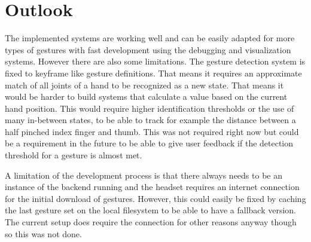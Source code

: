 \chapter{Outlook}

The implemented systems are working well and can be easily adapted for more types of gestures with fast development using the debugging and visualization systems. However there are also some limitations. The gesture detection system is fixed to keyframe like gesture definitions. That means it requires an approximate match of all joints of a hand to be recognized as a new state. That means it would be harder to build systems that calculate a value based on the current hand position. This would require higher identification thresholds or the use of many in-between states, to be able to track for example the distance between a half pinched index finger and thumb. This was not required right now but could be a requirement in the future to be able to give user feedback if the detection threshold for a gesture is almost met. 

A limitation of the development process is that there always needs to be an instance of the backend running and the headset requires an internet connection for the initial download of gestures. However, this could easily be fixed by caching the last gesture set on the local filesystem to be able to have a fallback version. The current setup does require the connection for other reasons anyway though so this was not done.
